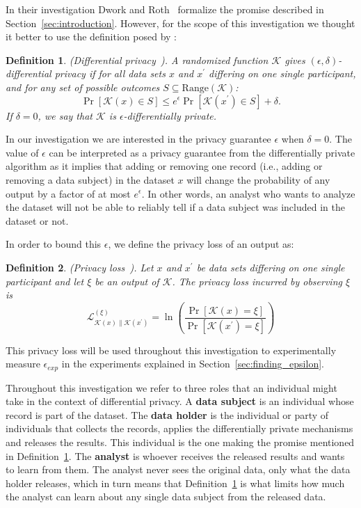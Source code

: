 \documentclass{ieeeaccess}
\newtheorem{definition}{Definition}[section]
\begin{document}
In their investigation Dwork and Roth~\cite{dwork2014algorithmic} formalize the promise described in Section~\ref{sec:introduction}. However, for the scope of this investigation we thought it better to use the definition posed by \cite{zhou2017differential}:

\begin{definition}
  (Differential privacy~\cite[Def.~1]{zhou2017differential}). A randomized function $\mathcal{K}$ gives $(\epsilon, \delta)$-differential privacy if for all data sets $x$ and $x^{\prime}$ differing on one single participant, and for any set of possible outcomes $S \subseteq \mathrm{Range}(\mathcal{K})$:
  \[
    \Pr[\mathcal{K}(x) \in S] \leq e^{\epsilon} \Pr[\mathcal{K}(x^{\prime}) \in S] + \delta.
  \]
  If $\delta = 0$, we say that $\mathcal{K}$ is $\epsilon$-differentially private.
  \label{def:dp}
\end{definition}

In our investigation we are interested in the privacy guarantee $\epsilon$ when $\delta = 0$. The value of $\epsilon$ can be interpreted as a privacy guarantee from the differentially private algorithm as it implies that adding or removing one record (i.e., adding or removing a data subject) in the dataset $x$ will change the probability of any output by a factor of at most $e^{\epsilon}$. In other words, an analyst who wants to analyze the dataset will not be able to reliably tell if a data subject was included in the dataset or not.

In order to bound this $\epsilon$, we define the privacy loss of an output as:

\begin{definition}
  (Privacy loss~\cite[Sec.~2.3]{dwork2014algorithmic}). Let $x$ and $x^{\prime}$ be data sets differing on one single participant and let $\xi$ be an output of $\mathcal{K}$. The privacy loss incurred by observing $\xi$ is
  \[
    \mathcal{L}^{(\xi)}_{\mathcal{K}(x) \| \mathcal{K}(x^{\prime})} = \ln\left(\frac{\Pr[\mathcal{K}(x) = \xi]}{\Pr[\mathcal{K}(x^{\prime}) = \xi]}\right)
  \]
  \label{def:privacy_loss}
\end{definition}

This privacy loss will be used throughout this investigation to experimentally measure $\epsilon_{exp}$ in the experiments explained in Section~\ref{sec:finding_epsilon}.

Throughout this investigation we refer to three roles that an individual might take in the context of differential privacy. A \textbf{data subject} is an individual whose record is part of the dataset. The \textbf{data holder} is the individual or party of individuals that collects the records, applies the differentially private mechanisms and releases the results. This individual is the one making the promise mentioned in Definition~\ref{def:dp}. The \textbf{analyst} is whoever receives the released results and wants to learn from them. The analyst never sees the original data, only what the data holder releases, which in turn means that Definition~\ref{def:dp} is what limits how much the analyst can learn about any single data subject from the released data.
\end{document}
